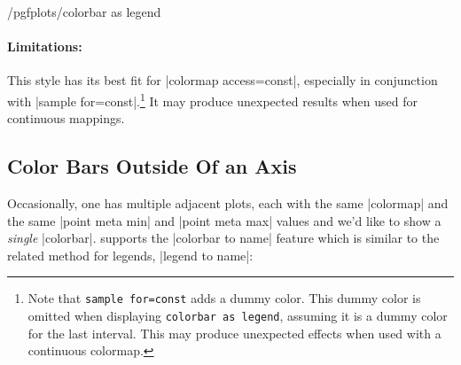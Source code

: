 \begin{stylekey}{/pgfplots/colorbar as legend}
    \paragraph{Limitations:}

    This style has its best fit for |colormap access=const|, especially in
    conjunction with |sample for=const|.\footnote{Note that \texttt{sample
    for=const} adds a dummy color. This dummy color is omitted when displaying
    \texttt{colorbar as legend}, assuming it is a dummy color for the last
    interval. This may produce unexpected effects when used with a continuous
    colormap.} It may produce unexpected results when used for continuous
    mappings.
\end{stylekey}


\subsection{Color Bars Outside Of an Axis}

Occasionally, one has multiple adjacent plots, each with the same |colormap|
and the same |point meta min| and |point meta max| values and we'd like to show
a \emph{single} |colorbar|. \PGFPlots{} supports the |colorbar to name| feature
which is similar to the related method for legends, |legend to name|:


